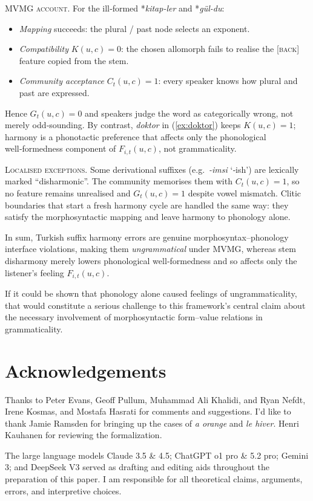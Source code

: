 \documentclass[12pt,letterpaper]{article}
\newcommand{\mention}[1]{\textit{#1}}
\newcommand{\olang}[1]{\textit{#1}}
\begin{document}
\textsc{MVMG account.}
For the ill‑formed *\mention{kitap-ler} and *\mention{gül-du}:

\begin{itemize}
\item \emph{Mapping} succeeds: the plural / past node selects an exponent.
\item \emph{Compatibility} $K(u,c)=0$: the chosen allomorph fails to realise the
      \textsc{[back]} feature copied from the stem.
\item \emph{Community acceptance} $C_t(u,c)=1$: every speaker knows how plural
      and past are expressed.
\end{itemize}

Hence $G_t(u,c)=0$ and speakers judge the word as categorically wrong, not merely
odd‑sounding.  By contrast, \mention{doktor} in (\ref{ex:doktor}) keeps $K(u,c)=1$;
harmony is a phonotactic preference that affects only the phonological
well‑formedness component of $F_{i,t}(u,c)$, not grammaticality.

\textsc{Localised exceptions.}
Some derivational suffixes (e.g.~\mention{-imsi} `‑ish') are lexically
marked \enquote{disharmonic}.  The community memorises them with $C_t(u,c)=1$, so no
feature remains unrealised and $G_t(u,c)=1$ despite vowel mismatch.  Clitic
boundaries that start a fresh harmony cycle \autocite{KabakVogel2001} are
handled the same way: they satisfy the morphosyntactic mapping and leave
harmony to phonology alone.

In sum, Turkish suffix harmony errors are genuine morphosyntax--phonology
interface violations, making them \emph{ungrammatical} under MVMG, whereas
stem disharmony merely lowers phonological well‑formedness and so affects only
the listener's feeling $F_{i,t}(u,c)$.



If it could be shown that phonology alone caused feelings of ungrammaticality, that would constitute a serious challenge to this framework's central claim about the necessary involvement of morphosyntactic form--value relations in grammaticality.


\newpage
\section*{Acknowledgements}
Thanks to Peter Evans, Geoff Pullum, Muhammad Ali Khalidi, and Ryan Nefdt, Irene Kosmas, and Mostafa Hasrati for comments and suggestions. I'd like to thank Jamie Ramsden for bringing up the cases of \mention{a orange} and \olang{le hiver}. Henri Kauhanen for reviewing the formalization.

The large language models Claude 3.5 \& 4.5; ChatGPT o1 pro \& 5.2 pro; Gemini 3; and DeepSeek V3 served as drafting and editing aids throughout the preparation of this paper. I am responsible for all theoretical claims, arguments, errors, and interpretive choices.

\newpage
\begin{sloppypar}
\printbibliography[title=References]
\end{sloppypar}
\end{document}
